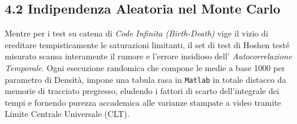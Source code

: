 \documentclass[11pt,a4paper]{article}
\begin{document}
\subsection*{4.2 Indipendenza Aleatoria nel Monte Carlo}
Mentre per i test su catena di \textit{Code Infinita (Birth-Death)} vige il vizio di ereditare tempisticamente le saturazioni limitanti, il set di test di Hoshen testé misurato scansa interamente il rumore e l'errore insidioso dell' \textit{Autocorrelazione Temporale}. Ogni esecuzione randomica che compone le medie a base 1000 per parametro di Densità, impone una tabula rasa in \texttt{Matlab} in totale distacco da memorie di tracciato pregresso, eludendo i fattori di scarto dell'integrale dei tempi e fornendo purezza accademica alle varianze stampate a video tramite Limite Centrale Universale (CLT).
\end{document}
